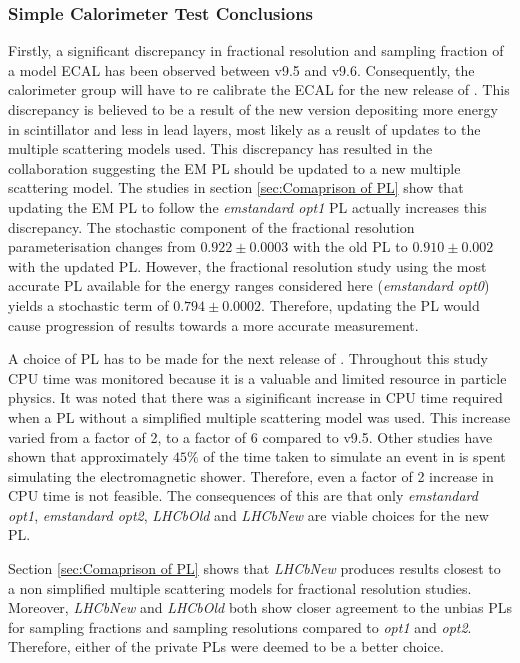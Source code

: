 \subsubsection{Simple Calorimeter Test Conclusions}
\label{ref:CaloConclusions}
Firstly, a significant discrepancy in fractional resolution and sampling fraction of a model \lhcb ECAL has been observed between \geant v9.5 and v9.6.  Consequently, the \lhcb calorimeter group will have to re calibrate the ECAL for the new release of \gauss. This discrepancy is believed to be a result of the new \geant version depositing more energy in scintillator and less in lead layers, most likely as a reuslt of updates to the multiple scattering models used.  This discrepancy has resulted in the \geant collaboration suggesting the \lhcb EM PL should be updated to a new multiple scattering model.  The studies in section \ref{sec:Comaprison of PL} show that updating the \lhcb EM PL to follow the \textit{emstandard opt1} PL actually increases this discrepancy. The stochastic component of the fractional resolution parameterisation changes from $0.922 \pm 0.0003$ with the old \lhcb PL to $0.910\pm 0.002$ with the updated \lhcb PL. However, the fractional resolution study using the most accurate PL available for the energy ranges considered here (\textit{emstandard opt0}) yields a stochastic term of $0.794\pm0.0002$.  Therefore, updating the \lhcb PL would cause progression of results towards a more accurate measurement.

A choice of PL has to be made for the next release of \gauss.  Throughout this study CPU time was monitored because it is a valuable and limited resource in particle physics.  It was noted that there was a siginificant increase in CPU time required when a PL without a simplified multiple scattering model was used. This increase varied from a factor of 2, to a factor of 6 compared to v9.5.  Other studies have shown that approximately $45\%$ of the time taken to simulate an event in \gauss is spent simulating the electromagnetic shower.  Therefore, even a factor of 2 increase in CPU time is not feasible.  The consequences of this are that only \textit{emstandard opt1}, \textit{emstandard opt2}, \textit{LHCbOld} and \textit{LHCbNew} are viable choices for the new PL.

Section \ref{sec:Comaprison of PL} shows that \textit{LHCbNew} produces results closest to a non simplified multiple scattering models for fractional resolution studies.  Moreover, \textit{LHCbNew} and \textit{LHCbOld} both show closer agreement to the unbias PLs for sampling fractions and sampling resolutions compared to \textit{opt1} and \textit{opt2}.  Therefore, either of the \lhcb private PLs were deemed to be a better choice. 

